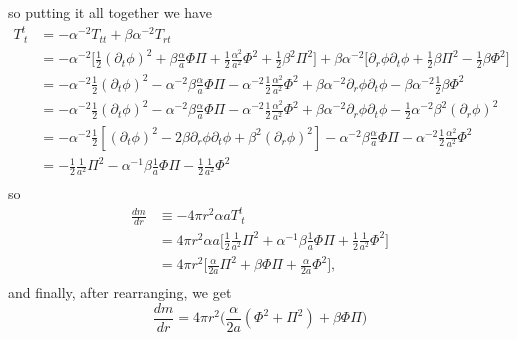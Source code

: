 \documentclass[12pt]{article}
\numberwithin{equation}{section}
\begin{document}
so putting it all together we have
\begin{equation*}
\begin{aligned}
T^{t}_{~t} &= -\alpha^{-2} T_{tt} + \beta \alpha^{-2} T_{rt} \\
&= -\alpha^{-2} \Big[ \frac{1}{2} (\partial_t \phi)^2 + \beta \frac{\alpha}{a} \Phi \Pi + \frac{1}{2} \frac{\alpha^2}{a^{2}} \Phi^2 + \frac{1}{2} \beta^2 \Pi^2 \Big] + \beta \alpha^{-2} \Big[ \partial_r \phi \partial_t \phi + \frac{1}{2} \beta \Pi^2 - \frac{1}{2} \beta \Phi^2 \Big] \\
&= - \alpha^{-2} \frac{1}{2} (\partial_t \phi)^2 - \alpha^{-2} \beta \frac{\alpha}{a} \Phi \Pi - \alpha^{-2} \frac{1}{2} \frac{\alpha^2}{a^{2}} \Phi^2 + \beta \alpha^{-2} \partial_r \phi \partial_t \phi - \beta \alpha^{-2} \frac{1}{2} \beta \Phi^2 \\
&= - \alpha^{-2} \frac{1}{2} (\partial_t \phi)^2 - \alpha^{-2} \beta \frac{\alpha}{a} \Phi \Pi - \alpha^{-2} \frac{1}{2} \frac{\alpha^2}{a^{2}} \Phi^2 + \beta \alpha^{-2} \partial_r \phi \partial_t \phi - \frac{1}{2} \alpha^{-2} \beta^2 (\partial_r \phi)^2 \\
&= - \alpha^{-2} \frac{1}{2} [(\partial_t \phi)^2 - 2 \beta \partial_r \phi \partial_t \phi + \beta^2 (\partial_r \phi)^2] - \alpha^{-2} \beta \frac{\alpha}{a} \Phi \Pi - \alpha^{-2} \frac{1}{2} \frac{\alpha^2}{a^{2}} \Phi^2 \\
&= - \frac{1}{2} \frac{1}{a^2} \Pi^2 - \alpha^{-1} \beta \frac{1}{a} \Phi \Pi - \frac{1}{2} \frac{1}{a^{2}} \Phi^2 \\
\end{aligned}
\end{equation*}
so
\begin{equation*}
\begin{aligned}
\frac{d m}{d r} &\equiv - 4 \pi r^2 \alpha a T^t_{~t} \\
&= 4 \pi r^2 \alpha a \Big[ \frac{1}{2} \frac{1}{a^2} \Pi^2 + \alpha^{-1} \beta \frac{1}{a} \Phi \Pi + \frac{1}{2} \frac{1}{a^{2}} \Phi^2 \Big] \\
&= 4 \pi r^2 \Big[ \frac{\alpha}{2 a} \Pi^2 +  \beta \Phi \Pi + \frac{\alpha}{2 a} \Phi^2 \Big], \\
\end{aligned}
\end{equation*}
and finally, after rearranging, we get
\begin{equation}
\frac{d m}{d r} = 4 \pi r^2 \Big( \frac{\alpha}{2 a} ( \Phi^2 + \Pi^2) + \beta \Phi \Pi \Big)
\end{equation}
\end{document}

